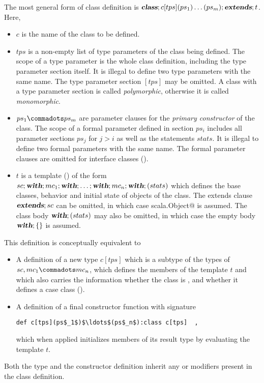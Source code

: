 \documentclass[11pt]{report}
\begin{document}
The most general form of class definition is $\mbox{\sl\bfseries class};c[tps](ps_1)
\ldots (ps_m);\mbox{\sl\bfseries extends};t$. Here,
\begin{itemize}
\item[]
$c$ is the name of the class to be defined.
\item[]
$tps$ is a non-empty list of type parameters of the class being
defined.  The scope of a type parameter is the whole class definition,
including the type parameter section itself.  It is illegal to define
two type parameters with the same name.  The type parameter section
$[tps]$ may be omitted. A class with a type parameter section is
called {\em polymorphic}, otherwise it is called {\em monomorphic}.
\item[] $ps_1 \commadots ps_m$ are parameter clauses for the {\em primary
constructor} of the class. The scope of a formal parameter defined in
section $ps_i$ includes all parameter sections $ps_j$ for $j > i$ as
well as the statements $stats$.  It is illegal to define two formal
parameters with the same name.  The formal
parameter clauses are omitted for interface classes ().
\item[] $t$ is a
template () of the form
$sc;\mbox{\sl\bfseries with};mc_1;\mbox{\sl\bfseries with};\ldots;\mbox{\sl\bfseries with};mc_n;\mbox{\sl\bfseries with};(stats)$
which defines the base classes, behavior and initial state of objects of
the class. The extends clause $\mbox{\sl\bfseries extends};sc$ can be omitted, in which case
\verb@extends scala.Object@ is assumed.  The class body
$\mbox{\sl\bfseries with};(stats)$ may also be omitted, in which case the empty body
$\mbox{\sl\bfseries with};\{\}$ is assumed.
\end{itemize}
This definition is conceptually equivalent to
\begin{itemize}
\item[]
A definition of a new type $c[tps]$ which is a subtype of the types of
$sc, mc_1 \commadots mc_n$, which defines the
members of the template $t$ and which also carries the information
whether the class is \verb@final@, and whether it defines a case class
().
\item[]
A definition of a final constructor function with signature
\begin{verbatim}
def c[tps](ps$_1$)$\ldots$(ps$_n$):class c[tps]  ,
\end{verbatim}
which when applied
initializes members of its result type by evaluating the template $t$.
\end{itemize}
Both the type and the constructor definition inherit any
\verb@private@ or \verb@protected@ modifiers present in the class
definition.
\end{document}
